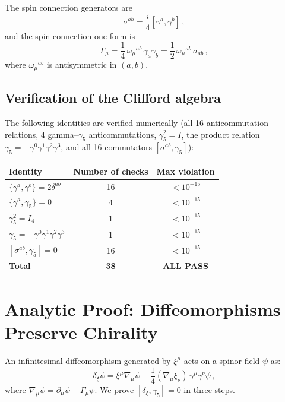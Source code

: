 \documentclass[11pt,a4paper]{article}
\begin{document}
The spin connection generators are
\begin{equation}\label{eq:sigma-ab}
  \sigma^{ab} = \frac{i}{4}[\gamma^a, \gamma^b] \,,
\end{equation}
and the spin connection one-form is
\begin{equation}\label{eq:spin-conn}
  \Gamma_\mu = \frac{1}{4}\,\omega_\mu{}^{ab}\,\gamma_a\gamma_b
  = \frac{1}{2}\,\omega_\mu{}^{ab}\,\sigma_{ab} \,,
\end{equation}
where $\omega_\mu{}^{ab}$ is antisymmetric in $(a,b)$.

\subsection{Verification of the Clifford algebra}

The following identities are verified numerically (all 16 anticommutation
relations, 4 gamma--$\gamma_5$ anticommutations, $\gamma_5^2 = I$,
the product relation $\gamma_5 = -\gamma^0\gamma^1\gamma^2\gamma^3$,
and all 16 commutators $[\sigma^{ab}, \gamma_5]$):
\begin{center}
\begin{tabular}{lcc}
\toprule
Identity & Number of checks & Max violation \\
\midrule
$\{\gamma^a, \gamma^b\} = 2\delta^{ab}$ & 16 & $< 10^{-15}$ \\
$\{\gamma^a, \gamma_5\} = 0$ & 4 & $< 10^{-15}$ \\
$\gamma_5^2 = I_4$ & 1 & $< 10^{-15}$ \\
$\gamma_5 = -\gamma^0\gamma^1\gamma^2\gamma^3$ & 1 & $< 10^{-15}$ \\
$[\sigma^{ab}, \gamma_5] = 0$ & 16 & $< 10^{-15}$ \\
\midrule
\textbf{Total} & \textbf{38} & \textcolor{proven}{\textbf{ALL PASS}} \\
\bottomrule
\end{tabular}
\end{center}

\section{Analytic Proof: Diffeomorphisms Preserve Chirality}
\label{sec:analytic}

An infinitesimal diffeomorphism generated by $\xi^\mu$ acts on a spinor
field $\psi$ as:
\begin{equation}\label{eq:diffeo-spinor}
  \delta_\xi \psi = \xi^\mu \nabla_\mu \psi
  + \frac{1}{4}(\nabla_\mu \xi_\nu)\,\gamma^\mu\gamma^\nu \psi \,,
\end{equation}
where $\nabla_\mu \psi = \partial_\mu \psi + \Gamma_\mu \psi$.
We prove $[\delta_\xi, \gamma_5] = 0$ in three steps.
\end{document}
